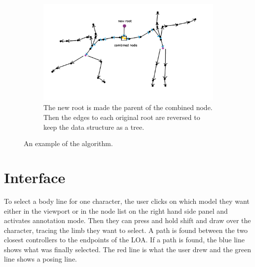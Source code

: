 \begin{figure}[h!]
\begin{subfigure}[b!]{0.6\textwidth}
        \end{subfigure}%
        \quad
        \begin{subfigure}[b!]{0.6\textwidth}
        	\centering
                \includegraphics[width=\linewidth]{img/algorithm4}
                \caption{The new root is made the parent of the combined node. Then the edges to each original root are reversed to keep the data structure as a tree.}
        \end{subfigure}
    \caption{An example of the algorithm.}
	\label{fig:example}
\end{figure}

\section{Interface}
To select a body line for one character, the user clicks on which model they want either in the viewport or in the node list on the right hand side panel and activates annotation mode. Then they can press and hold shift and draw over the character, tracing the limb they want to select. A path is found between the two closest controllers to the endpoints of the LOA. If a path is found, the blue line shows what was finally selected. The red line is what the user drew and the green line shows a posing line.

